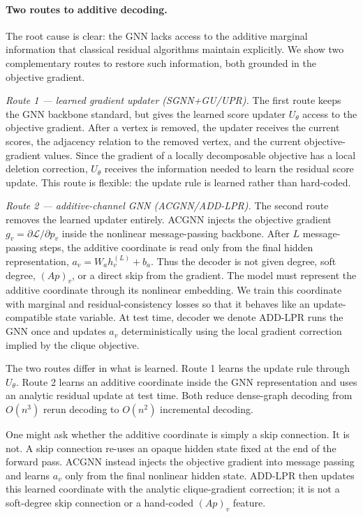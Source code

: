 \documentclass[11pt]{article}
\newcommand{\change}[1]{{\color{red}#1}}
\theoremstyle{plain}
\theoremstyle{definition}
\theoremstyle{remark}
\begin{document}
\paragraph{\change{Two routes to additive decoding.}}
The root cause is clear: the GNN lacks access to the additive marginal information
that classical residual algorithms maintain explicitly. We show two complementary
routes to restore such information, both grounded in the objective gradient.

\emph{Route 1 --- learned gradient updater (SGNN+GU/UPR).}
The first route keeps the GNN backbone standard, but gives the learned score updater
$U_\theta$ access to the objective gradient. After a vertex is removed, the updater
receives the current scores, the adjacency relation to the removed vertex, and the
current objective-gradient values. Since the gradient of a locally decomposable
objective has a local deletion correction, $U_\theta$ receives the information needed
to learn the residual score update. This route is flexible: the update rule is learned
rather than hard-coded.

\emph{Route 2 --- additive-channel GNN (ACGNN/ADD-LPR).}
The second route removes the learned updater entirely. ACGNN injects the objective
gradient
$
g_v=\partial \mathcal{L}/\partial p_v
$
inside the nonlinear message-passing backbone. After $L$ message-passing steps, the
additive coordinate is read only from the final hidden representation,
$
a_v = W_a h_v^{(L)}+b_a.
$
Thus the decoder is not given degree, soft degree, $(Ap)_v$, or a direct skip from
the gradient. The model must represent the additive coordinate through its nonlinear
embedding. We train this coordinate with marginal and residual-consistency losses so
that it behaves like an update-compatible state variable. At test time, decoder we denote ADD-LPR runs
the GNN once and updates $a_v$ deterministically using the local gradient correction
implied by the clique objective.

The two routes differ in what is learned. Route 1 learns the update rule through
$U_\theta$. Route 2 learns an additive coordinate inside the GNN representation and
uses an analytic residual update at test time. Both reduce dense-graph decoding from
$O(n^3)$ rerun decoding to $O(n^2)$ incremental decoding.

\change{One might ask whether the additive coordinate is simply a skip connection. It is
  not. A skip connection re-uses an opaque hidden state fixed at the end of the forward
  pass. ACGNN instead injects the objective gradient into message passing and learns
  $a_v$ only from the final nonlinear hidden state. ADD-LPR then updates this learned
  coordinate with the analytic clique-gradient correction; it is not a soft-degree skip
connection or a hand-coded $(Ap)_v$ feature.}
\end{document}
